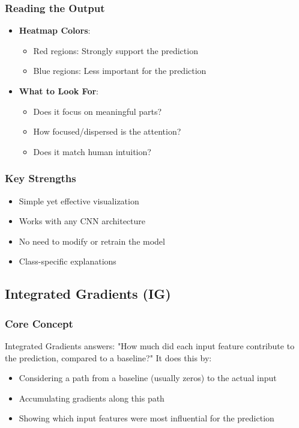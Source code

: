 \documentclass{article}
\begin{document}
\subsubsection{Reading the Output}
\begin{itemize}
    \item \textbf{Heatmap Colors}:
        \begin{itemize}
            \item Red regions: Strongly support the prediction
            \item Blue regions: Less important for the prediction
        \end{itemize}
    \item \textbf{What to Look For}:
        \begin{itemize}
            \item Does it focus on meaningful parts?
            \item How focused/dispersed is the attention?
            \item Does it match human intuition?
        \end{itemize}
\end{itemize}

\subsubsection{Key Strengths}
\begin{itemize}
    \item Simple yet effective visualization
    \item Works with any CNN architecture
    \item No need to modify or retrain the model
    \item Class-specific explanations
\end{itemize}

\subsection{Integrated Gradients (IG)}

\subsubsection{Core Concept}
Integrated Gradients answers: "How much did each input feature contribute to the prediction, compared to a baseline?" It does this by:
\begin{itemize}
    \item Considering a path from a baseline (usually zeros) to the actual input
    \item Accumulating gradients along this path
    \item Showing which input features were most influential for the prediction
\end{itemize}
\end{document}
